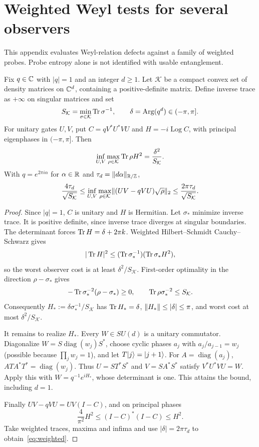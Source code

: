 \section{Weighted Weyl tests for several observers}\label{app:weighted}
This appendix evaluates Weyl-relation defects against a family of weighted probes. Probe entropy alone is not identified with usable entanglement.

\begin{theorem}\label{thm:weighted}
Fix $q\in\mathbb C$ with $|q|=1$ and an integer $d\ge1$. Let $\mathcal K$ be a compact convex set of density matrices on $\mathbb C^d$, containing a positive-definite matrix. Define inverse trace as $+\infty$ on singular matrices and set
\[
 S_{\mathcal K}=\min_{\sigma\in\mathcal K}\operatorname{Tr}\sigma^{-1},\qquad
 \delta=\operatorname{Arg}(q^d)\in(-\pi,\pi].
\]
For unitary gates $U,V$, put $C=qV^*U^*VU$ and $H=-i\operatorname{Log}C$, with principal eigenphases in $(-\pi,\pi]$. Then
\[
 \inf_{U,V}\max_{\rho\in\mathcal K}\operatorname{Tr}\rho H^2
       =\frac{\delta^2}{S_{\mathcal K}}.
\]
With $q=e^{2\pi i\alpha}$ for $\alpha\in\mathbb R$ and $\tau_d=\lVert d\alpha\rVert_{\mathbb R/\mathbb Z}$,
\begin{equation}
 \frac{4\tau_d}{\sqrt{S_{\mathcal K}}}
 \le\inf_{U,V}\max_{\rho\in\mathcal K}\lVert(UV-qVU)\sqrt\rho\rVert_2
 \le\frac{2\pi\tau_d}{\sqrt{S_{\mathcal K}}}.\label{eq:weighted}
\end{equation}
\end{theorem}
\begin{proof}
Since $|q|=1$, $C$ is unitary and $H$ is Hermitian. Let $\sigma_*$ minimize inverse trace. It is positive definite, since inverse trace diverges at singular boundaries. The determinant forces $\operatorname{Tr} H=\delta+2\pi k$. Weighted Hilbert--Schmidt Cauchy--Schwarz gives
\[
 |\operatorname{Tr} H|^2\le(\operatorname{Tr}\sigma_*^{-1})(\operatorname{Tr}\sigma_*H^2),
\]
so the worst observer cost is at least $\delta^2/S_{\mathcal K}$. First-order optimality in the direction $\rho-\sigma_*$ gives
\[
 -\operatorname{Tr}\sigma_*^{-2}(\rho-\sigma_*)\ge0,
 \qquad\operatorname{Tr}\rho\sigma_*^{-2}\le S_{\mathcal K}.
\]
Consequently $H_*:=\delta\sigma_*^{-1}/S_{\mathcal K}$ has $\operatorname{Tr} H_*=\delta$, $\lVert H_*\rVert\le|\delta|\le\pi$, and worst cost at most $\delta^2/S_{\mathcal K}$.

It remains to realize $H_*$. Every $W\in SU(d)$ is a unitary commutator. Diagonalize $W=S\operatorname{diag}(w_j)S^*$, choose cyclic phases $a_j$ with $a_j/a_{j-1}=w_j$ (possible because $\prod_jw_j=1$), and let $T|j\rangle=|j+1\rangle$. For $A=\operatorname{diag}(a_j)$, $ATA^*T^*=\operatorname{diag}(w_j)$. Thus $U=ST^*S^*$ and $V=SA^*S^*$ satisfy $V^*U^*VU=W$. Apply this with $W=q^{-1}e^{iH_*}$, whose determinant is one. This attains the bound, including $d=1$.

Finally $UV-qVU=UV(I-C)$, and on principal phases
\[
 \frac4{\pi^2}H^2\le(I-C)^*(I-C)\le H^2.
\]
Take weighted traces, maxima and infima and use $|\delta|=2\pi\tau_d$ to obtain~\eqref{eq:weighted}.
\end{proof}

